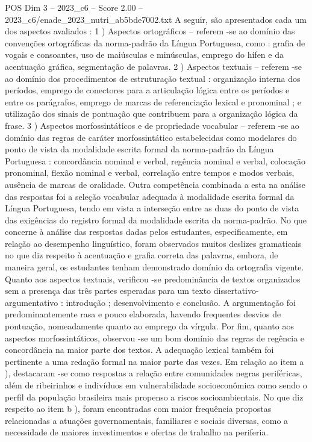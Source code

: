 \begin{textsample}{POS Dim 3 – 2023\_c6 – Score 2.00 – 2023\_c6/enade\_2023\_nutri\_ab5bde7002.txt}
A seguir, são apresentados cada um dos aspectos avaliados : 1 ) Aspectos ortográficos – referem -se ao domínio das convenções ortográficas da norma-padrão da Língua Portuguesa, como : grafia de vogais e consoantes, uso de maiúsculas e minúsculas, emprego do hífen e da acentuação gráfica, segmentação de palavras. 2 ) Aspectos textuais – referem -se ao domínio dos procedimentos de estruturação textual : organização interna dos períodos, emprego de conectores para a articulação lógica entre os períodos e entre os parágrafos, emprego de marcas de referenciação lexical e pronominal ; e utilização dos sinais de pontuação que contribuem para a organização lógica da frase. 3 ) Aspectos morfossintáticos e de propriedade vocabular – referem -se ao domínio das regras de caráter morfossintático estabelecidas como modelares do ponto de vista da modalidade escrita formal da norma-padrão da Língua Portuguesa : concordância nominal e verbal, regência nominal e verbal, colocação pronominal, flexão nominal e verbal, correlação entre tempos e modos verbais, ausência de marcas de oralidade.
Outra competência combinada a esta na análise das respostas foi a seleção vocabular adequada à modalidade escrita formal da Língua Portuguesa, tendo em vista a interseção entre as duas do ponto de vista das exigências do registro formal da modalidade escrita da norma-padrão.
No que concerne à análise das respostas dadas pelos estudantes, especificamente, em relação ao desempenho linguístico, foram observados muitos deslizes gramaticais no que diz respeito à acentuação e grafia correta das palavras, embora, de maneira geral, os estudantes tenham demonstrado domínio da ortografia vigente.
Quanto aos aspectos textuais, verificou -se predominância de textos organizados sem a presença das três partes esperadas para um texto dissertativo-argumentativo : introdução ; desenvolvimento e conclusão.
A argumentação foi predominantemente rasa e pouco elaborada, havendo frequentes desvios de pontuação, nomeadamente quanto ao emprego da vírgula.
Por fim, quanto aos aspectos morfossintáticos, observou -se um bom domínio das regras de regência e concordância na maior parte dos textos.
A adequação lexical também foi pertinente a uma redação formal na maior parte das vezes.
Em relação ao item a ), destacaram -se como respostas a relação entre comunidades negras periféricas, além de ribeirinhos e indivíduos em vulnerabilidade socioeconômica como sendo o perfil da população brasileira mais propenso a riscos socioambientais.
No que diz respeito ao item b ), foram encontradas com maior frequência propostas relacionadas a atuações governamentais, familiares e sociais diversas, como a necessidade de maiores investimentos e ofertas de trabalho na periferia.

\end{textsample}
